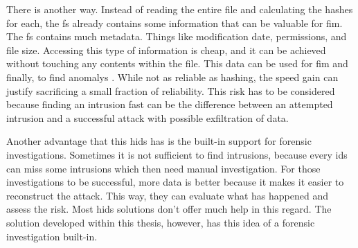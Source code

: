 There is another way. Instead of reading the entire file and calculating the hashes for each, the \gls{fs} already contains some information that can be valuable for \gls{fim}. The \gls{fs} contains much \gls{metadata}. Things like modification date, permissions, and file size. Accessing this type of information is cheap, and it can be achieved without touching any contents within the file. This data can be used for \gls{fim} and finally, to find \glspl{anomaly} \cite{inode}. While not as reliable as hashing, the speed gain can justify sacrificing a small fraction of reliability. This risk has to be considered because finding an intrusion fast can be the difference between an attempted intrusion and a successful attack with possible exfiltration of data. 

Another advantage that this \gls{hids} has is the built-in support for forensic investigations. Sometimes it is not sufficient to find intrusions, because every \gls{ids} can miss some intrusions which then need manual investigation. For those investigations to be successful, more data is better because it makes it easier to reconstruct the attack. This way, they can evaluate what has happened and assess the risk. Most \gls{hids} solutions don't offer much help in this regard. The solution developed within this thesis, however, has this idea of a forensic investigation built-in.

